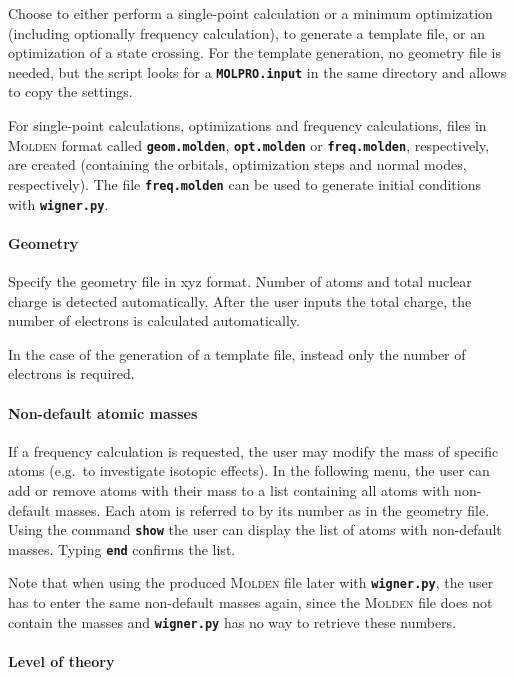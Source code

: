\documentclass[a4paper,10pt,DIV=15,openany]{scrbook}
\newcommand{\ttt}[1]{\textbf{\texttt{#1}}}
\begin{document}
Choose to either perform a single-point calculation or a minimum optimization (including optionally frequency calculation), to generate a template file, or an optimization of a state crossing. For the template generation, no geometry file is needed, but the script looks for a \ttt{MOLPRO.input} in the same directory and allows to copy the settings. 

For single-point calculations, optimizations and frequency calculations, files in \textsc{Molden} format called \ttt{geom.molden}, \ttt{opt.molden} or \ttt{freq.molden}, respectively, are created (containing the orbitals, optimization steps and normal modes, respectively). The file \ttt{freq.molden} can be used to generate initial conditions with \ttt{wigner.py}.

\paragraph{Geometry}

Specify the geometry file in xyz format. Number of atoms and total nuclear charge is detected automatically. After the user inputs the total charge, the number of electrons is calculated automatically.

In the case of the generation of a template file, instead only the number of electrons is required.

\paragraph{Non-default atomic masses}

If a frequency calculation is requested, the user may modify the mass of specific atoms (e.g.\ to investigate isotopic effects). In the following menu, the user can add or remove atoms with their mass to a list containing all atoms with non-default masses. Each atom is referred to by its number as in the geometry file. Using the command \ttt{show} the user can display the list of atoms with non-default masses. Typing \ttt{end} confirms the list.

Note that when using the produced \textsc{Molden} file later with \ttt{wigner.py}, the user has to enter the same non-default masses again, since the \textsc{Molden} file does not contain the masses and \ttt{wigner.py} has no way to retrieve these numbers.

\paragraph{Level of theory}
\end{document}
